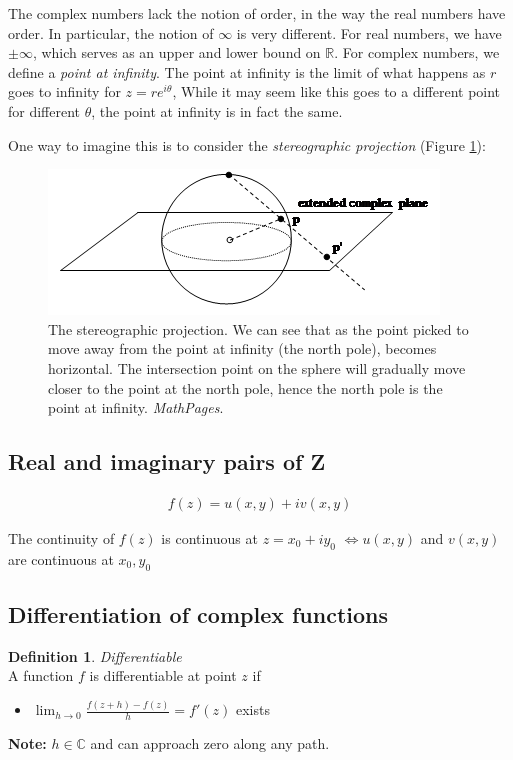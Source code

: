 \documentclass{article}
\theoremstyle{definition}
\newtheorem{definition}{Definition}[section]
\newcommand{\Def}[2]{
\begin{shaded*}
\begin{definition}{\textit{#1}}\\#2\end{definition}
\end{shaded*}
}
\def\R{\mathbb{R}}
\def\C{\mathbb{C}}
\begin{document}
The complex numbers lack the notion of order, in the way the real numbers have order. In particular, the notion of $\infty$ is very different. For real numbers, we have $\pm \infty$, which serves as an upper and lower bound on $\R$. For complex numbers, we define a \textit{point at infinity}. The point at infinity is the limit of what happens as $r$ goes to infinity for $z=r e^{i\theta}$, While it may seem like this goes to a different point for different $\theta$, the point at infinity is in fact the same.

One way to imagine this is to consider the \textit{stereographic projection} (Figure \ref{fig:stereographic}):
\begin{figure}[H]
	\centering
	\includegraphics[width=0.5\linewidth]{stereographic_projection}
	\caption{The stereographic projection. We can see that as the point picked to move away from the point at infinity (the north pole), becomes horizontal. The intersection point on the sphere will gradually move closer to the point at the north pole, hence the north pole is the point at infinity. \textit{MathPages}.}
	\label{fig:stereographic}
\end{figure}


\subsection{Real and imaginary pairs of Z}

\begin{align}
	f(z) = u(x,y)+iv(x,y)
\end{align}

The continuity of $f(z)$ is continuous at $z = x_0 + iy_0$ $\iff u(x,y)$ and $v(x,y)$ are continuous at $x_0, y_0$ 

\subsection{Differentiation of complex functions}

\Def{Differentiable}{A function $f$ is differentiable at point $z$ if 
\begin{itemize}
	\item $\lim_{h\to0} \frac{f(z+h) - f(z)}{h} = f'(z)$ exists
\end{itemize}

\textbf{Note:} $h \in \C$ and can approach zero along any path. 
}
\end{document}
